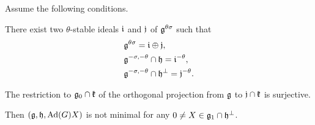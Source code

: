 \begin{proposition} \label{prop:ReductionRealStronglyOrthogonal}
	Assume the following conditions.
	\begin{enumparen}
		\item There exist two $\theta$-stable ideals $\mathfrak{i}$ and $\mathfrak{j}$ of $\mathfrak{g}^{\theta\sigma}$ such that
		\begin{align*}
			&\mathfrak{g}^{\theta\sigma} = \mathfrak{i} \oplus \mathfrak{j}, \\
			&\mathfrak{g}^{-\sigma, -\theta} \cap \mathfrak{h} = \mathfrak{i}^{-\theta}, \\
			&\mathfrak{g}^{-\sigma, -\theta} \cap \mathfrak{h}^\perp = \mathfrak{j}^{-\theta}.
		\end{align*}
		\item The restriction to $\mathfrak{g}_0\cap \mathfrak{k}$ of the orthogonal projection from $\mathfrak{g}$ to $\mathfrak{j}\cap \mathfrak{k}$ is surjective.
	\end{enumparen}
	Then $(\mathfrak{g}, \mathfrak{h}, \mathrm{Ad}(G)X)$ is not minimal for any $0\neq X \in \mathfrak{g}_1 \cap \mathfrak{h}^\perp$.
\end{proposition}

